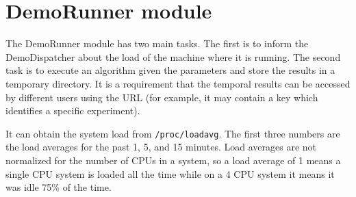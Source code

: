 
\section{DemoRunner module}
\label{sec:DemoRunner}
The DemoRunner module has two main tasks. The first is to inform the DemoDispatcher about the load of the machine where it is running. The second task is to execute an algorithm given the parameters and store the results in a temporary directory. It is a requirement that the temporal results can be accessed by different users using the URL (for example, it may contain a key which identifies a specific experiment).

It can obtain the system load from {\tt /proc/loadavg}. The first three numbers are the load averages for the past 1, 5, and 15 minutes. Load averages are not normalized for the number of CPUs in a system, so a load  average  of 1 means a single CPU system is loaded all the time while on a 4 CPU system it means it was idle 75\% of the time.

